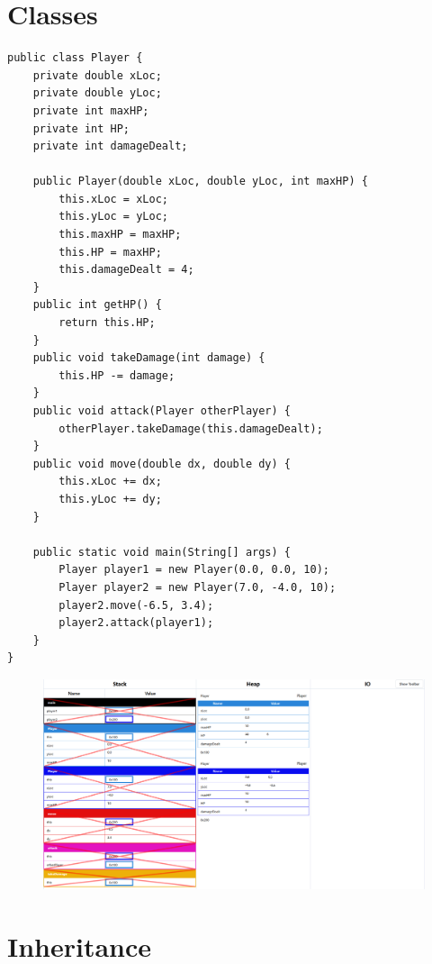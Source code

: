 \documentclass{article}
\begin{document}
\pagebreak


\section{Classes}

\begin{verbatim}
public class Player {
    private double xLoc;
    private double yLoc;
    private int maxHP;
    private int HP;
    private int damageDealt;

    public Player(double xLoc, double yLoc, int maxHP) {
        this.xLoc = xLoc;
        this.yLoc = yLoc;
        this.maxHP = maxHP;
        this.HP = maxHP;
        this.damageDealt = 4;
    }
    public int getHP() {
        return this.HP;
    }
    public void takeDamage(int damage) {
        this.HP -= damage;
    }
    public void attack(Player otherPlayer) {
        otherPlayer.takeDamage(this.damageDealt);
    }
    public void move(double dx, double dy) {
        this.xLoc += dx;
        this.yLoc += dy;
    }

    public static void main(String[] args) {
        Player player1 = new Player(0.0, 0.0, 10);
        Player player2 = new Player(7.0, -4.0, 10);
        player2.move(-6.5, 3.4);
        player2.attack(player1);
    }
}
\end{verbatim}

\begin{figure}[H]
	\centering
	\includegraphics{classes.png}
\end{figure}

\pagebreak


\section{Inheritance}
\end{document}
